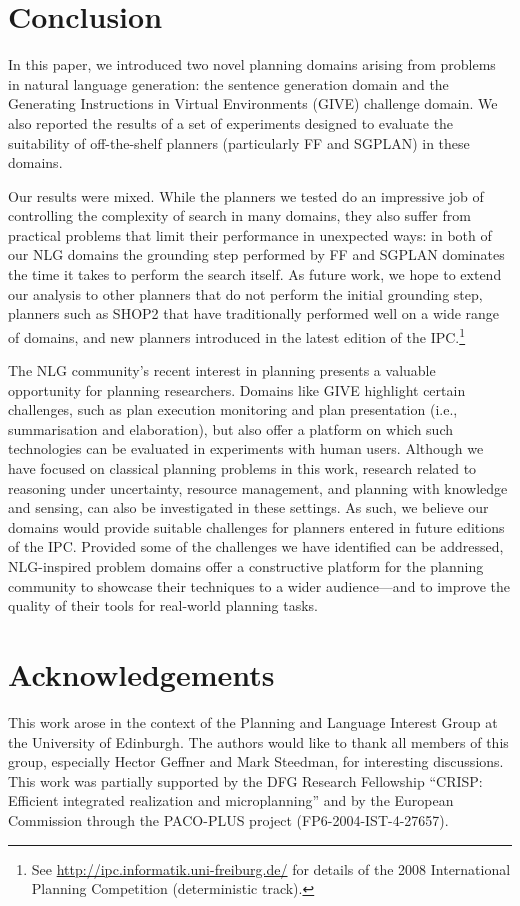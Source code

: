 \documentclass[letterpaper]{article}
\begin{document}
\section{Conclusion}
\label{sec:conclusion}

In this paper, we introduced two novel planning domains arising from
problems in natural language generation: the sentence generation domain and
the Generating Instructions in Virtual Environments (GIVE) challenge
domain. We also reported the results of a set of experiments designed to
evaluate the suitability of off-the-shelf planners (particularly FF and
SGPLAN) in these domains.

Our results were mixed. While the planners we tested do an impressive job
of controlling the complexity of search in many domains, they also suffer
from practical problems that limit their performance in unexpected ways: in
both of our NLG domains the grounding step performed by FF and SGPLAN
dominates the time it takes to perform the search itself. As future work,
we hope to extend our analysis to other planners that do not perform the
initial grounding step, planners such as SHOP2
\citep{DBLP:journals/jair/NauAIKMWY03} that have traditionally performed
well on a wide range of domains, and new planners introduced in the latest
edition of the IPC.\footnote{See
 \url{http://ipc.informatik.uni-freiburg.de/} for details of the 2008
 International Planning Competition (deterministic track).}

The NLG community's recent interest in planning presents a valuable
opportunity for planning researchers. Domains like GIVE highlight certain
challenges, such as plan execution monitoring and plan presentation (i.e.,
summarisation and elaboration), but also offer a platform on which such
technologies can be evaluated in experiments with human users. Although we
have focused on classical planning problems in this work, research related
to reasoning under uncertainty, resource management, and planning with
knowledge and sensing, can also be investigated in these settings. As such,
we believe our domains would provide suitable challenges for planners
entered in future editions of the IPC. Provided some of the challenges we
have identified can be addressed, NLG-inspired problem domains offer a
constructive platform for the planning community to showcase their
techniques to a wider audience---and to improve the quality of their tools
for real-world planning tasks. 


\section*{Acknowledgements}

This work arose in the context of the Planning and Language Interest Group
at the University of Edinburgh. The authors would like to thank all members
of this group, especially Hector Geffner and Mark Steedman, for interesting
discussions. This work was partially supported by the DFG Research
Fellowship ``CRISP: Efficient integrated realization and microplanning''
and by the European Commission through the PACO-PLUS project
(FP6-2004-IST-4-27657).





\pagebreak
\listoffigures
\end{document}
